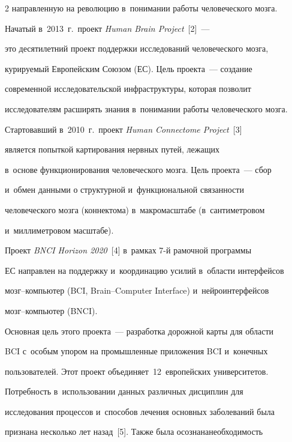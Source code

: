 \begin{multicols}{2}
направленную на революцию в~понимании работы человеческого мозга. 


    


    Начатый в~2013~г.\ проект \textit{Human Brain Project}~[2]~--- 


это десятилетний проект поддержки исследований человеческого мозга, 


курируемый Европейским Союзом (ЕС). Цель проекта~--- создание 


современной исследовательской инфраструктуры, которая позволит 


исследователям расширять знания в~понимании работы человеческого мозга. 


    


    Стартовавший в~2010~г.\ проект \textit{Human Connectome Project}~[3] 


    является попыткой картирования нервных путей, лежащих 


в~основе функционирования человеческого мозга. Цель проекта~--- сбор 


и~обмен данными о структурной и~функциональной связанности 


человеческого мозга (коннектома) в~макромасштабе (в~сантиметровом 


и~миллиметровом масштабе). 


    


    Проект \textit{BNCI Horizon 2020}~[4] в~рамках \mbox{7-й} рамочной программы 


ЕС направлен на поддержку и~координацию усилий в~области интерфейсов 


мозг--компьютер (BCI, Brain--Computer Interface) и~нейроинтерфейсов 


мозг--компьютер (\mbox{BNCI}). 


Основная цель этого проекта~--- разработка дорожной карты для области 


BCI с~особым упором на промышленные приложения BCI и~конечных 


пользователей. Этот проект объединяет~12~европейских университетов. 


    


    Потребность в~использовании данных различных дисциплин для 


исследования процессов и~способов лечения основных заболеваний была 


признана несколько лет назад~[5]. Также была осознана\linebreak необходимость 



\end{multicols}
